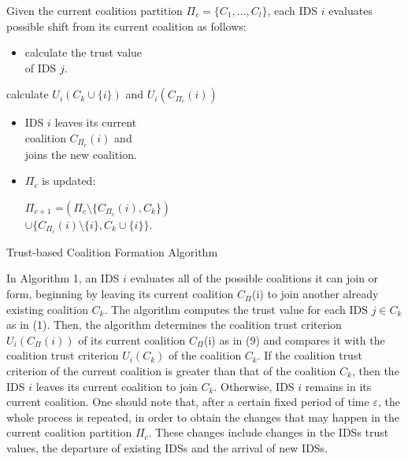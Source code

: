 \documentclass[conference]{IEEEtran}
\begin{document}
\begin{algorithm}[h]
\LinesNumbered
Given the current coalition partition $\Pi_{c} = \{C_{1}, . .
. , C_{l}\}$, each IDS $i$ evaluates possible shift from its
current coalition  as follows:

{
{
{

\begin{itemize}
\item calculate the trust
value \\ of IDS $j$.
\end{itemize}

}
}
calculate $U_{i}(C_{k} \cup \{i\})$ and $U_{i}(C_{\Pi_{c}}(i))$

{


\begin{itemize}
\item IDS $i$ leaves its current \\ coalition $C_{\Pi_{c}}(i)$ and \\ joins the new coalition.

\item $\Pi_{c}$ is updated:

$\Pi_{c+1}$ =$(\Pi_{c}\setminus \{C_{\Pi_{c}}(i), C_{k}\})$ \\ $\cup \{C_{\Pi_{c}}({i}) \setminus \{{i}\}, C_{k} \cup \{{i}\}\}$.
\end{itemize}


}
}
\caption{Trust-based Coalition Formation Algorithm}
\end{algorithm}


In Algorithm 1, an IDS $i$ evaluates all of the possible coalitions
it can join or form, beginning by leaving its current coalition $C_{\Pi}$(i) to
join another already existing coalition $C_{k}$. The algorithm
computes the trust value for each IDS $j \in C_{k}$ as in (1). Then, the algorithm determines the coalition trust criterion $U_{i}(C_{\Pi}(i))$ of its current coalition $C_{\Pi}$(i) as in (9) and compares it with the coalition trust criterion $U_{i}(C_{k})$ of the coalition $C_{k}$. If the coalition trust criterion of the current coalition is greater than that of the coalition $C_{k}$, then the IDS $i$ leaves its current coalition to join $C_{k}$. Otherwise, IDS $i$ remains in its current coalition. One should note that, after a certain fixed period of time $\varepsilon$, the whole process is repeated, in order to obtain the changes that may happen in the current coalition partition $\Pi_{c}$. These changes include changes in the IDSs trust values, the departure of existing IDSs and the arrival of new IDSs.
\end{document}

